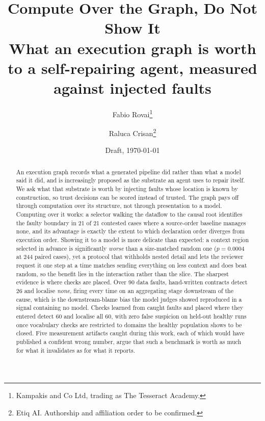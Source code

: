 \documentclass{article}
\title{Compute Over the Graph, Do Not Show It\\
\large What an execution graph is worth to a self-repairing agent, measured against
injected faults}
\author{Fabio Rovai\thanks{Kampakis and Co Ltd, trading as The Tesseract Academy.} \and Raluca Crisan\thanks{Etiq AI. Authorship and affiliation order to be confirmed.}}
\date{Draft, \today}
\begin{document}
\maketitle

\begin{abstract}
An execution graph records what a generated pipeline did rather than what a model said it
did, and is increasingly proposed as the substrate an agent uses to repair itself. We ask
what that substrate is worth by injecting faults whose location is known by construction,
so trust decisions can be scored instead of trusted. The graph pays off through
computation over its structure, not through presentation to a model. Computing over it
works: a selector walking the dataflow to the causal root identifies the faulty boundary
in 21 of 21 contested cases where a source-order baseline manages none, and its advantage
is exactly the extent to which declaration order diverges from execution order. Showing it
to a model is more delicate than expected: a context region selected in advance is significantly
\emph{worse} than a size-matched random one ($p=0.0004$ at 244 paired cases), yet a
protocol that withholds nested detail and lets the reviewer request it one step at a time
matches sending everything on less context and does beat random, so the benefit lies in
the interaction rather than the slice. The sharpest evidence is where checks are placed. Over 90 data faults,
hand-written contracts detect 26 and localise \emph{none}, firing every time on an
aggregating stage downstream of the cause, which is the downstream-blame bias the model
judges showed reproduced in a signal containing no model. Checks learned from caught
faults and placed where they entered detect 60 and localise all 60, with zero false
suspicion on held-out healthy runs once vocabulary checks are restricted to domains the
healthy population shows to be closed. Five measurement artifacts caught during this work,
each of which would have published a confident wrong number, argue that such a benchmark
is worth as much for what it invalidates as for what it reports.
\end{abstract}













\end{document}
